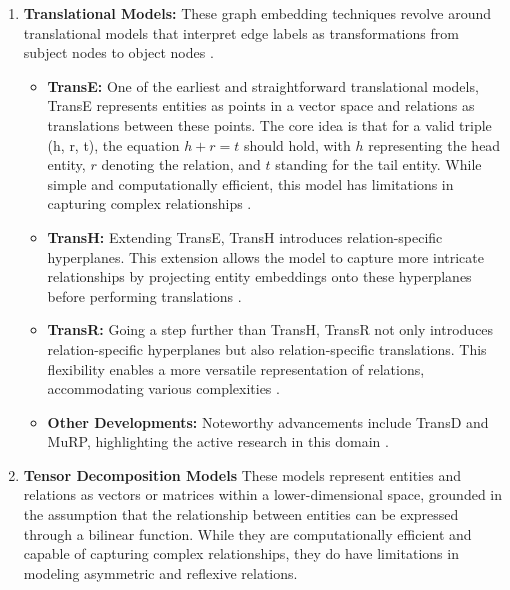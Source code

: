     \begin{enumerate}
        \item \textbf{Translational Models:} These graph embedding techniques revolve around translational models that interpret edge labels as transformations from subject nodes to object nodes \cite{hogan_knowledge_2022}.
        
        \begin{itemize}
            \item \textbf{TransE:} One of the earliest and straightforward translational models, TransE represents entities as points in a vector space and relations as translations between these points. The core idea is that for a valid triple (h, r, t), the equation $h+r = t$ should hold, with $h$ representing the head entity, $r$ denoting the relation, and $t$ standing for the tail entity. While simple and computationally efficient, this model has limitations in capturing complex relationships \cite{hogan_knowledge_2022}.
            
            \item \textbf{TransH:} Extending TransE, TransH introduces relation-specific hyperplanes. This extension allows the model to capture more intricate relationships by projecting entity embeddings onto these hyperplanes before performing translations \cite{hogan_knowledge_2022}.
            
            \item \textbf{TransR:} Going a step further than TransH, TransR not only introduces relation-specific hyperplanes but also relation-specific translations. This flexibility enables a more versatile representation of relations, accommodating various complexities \cite{hogan_knowledge_2022}.
            
            \item \textbf{Other Developments:} Noteworthy advancements include TransD and MuRP, highlighting the active research in this domain \cite{hogan_knowledge_2022}.
        \end{itemize}

        \item \textbf{Tensor Decomposition Models} These models represent entities and relations as vectors or matrices within a lower-dimensional space, grounded in the assumption that the relationship between entities can be expressed through a bilinear function. While they are computationally efficient and capable of capturing complex relationships, they do have limitations in modeling asymmetric and reflexive relations.


\end{enumerate}
